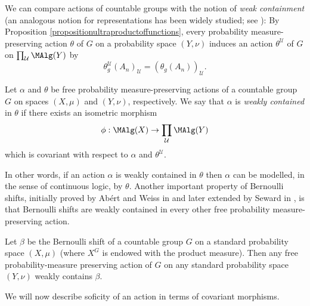 We can compare actions of countable groups with the notion of \emph{weak containment} (an analogous notion for representations has been widely studied; see \cite{MR2415834}): By Proposition \ref{propositionultraproductoffunctions}, every probability measure-preserving action $\theta$ of $G$ on a probability space $(Y,\nu)$ induces an action $\theta^\mathcal{U}$ of $G$ on $\prod_\mathcal{U}\MAlg(Y)$ by
\[\theta^\mathcal{U}_g(A_n)_\mathcal{U}=(\theta_g(A_n))_\mathcal{U}.\]


\begin{definition}[{\cite[p.\ 64]{MR2583950}}]
Let $\alpha$ and $\theta$ be free probability measure-preserving actions of a countable group $G$ on spaces $(X,\mu)$ and $(Y,\nu)$, respectively. We say that $\alpha$ is \emph{weakly contained} in $\theta$ if there exists an isometric morphism
\[\phi:\MAlg(X)\to\prod_\mathcal{U}\MAlg(Y)\]
which is covariant with respect to $\alpha$ and $\theta^\mathcal{U}$.
\end{definition}

In other words, if an action $\alpha$ is weakly contained in $\theta$ then $\alpha$ can be modelled, in the sense of continuous logic, by $\theta$. Another important property of Bernoulli shifts, initially proved by Abért and Weiss in \cite{MR3035287} and later extended by Seward in \cite{arxiv1501.03367v3}, is that Bernoulli shifts are weakly contained in every other free probability measure-preserving action.

\begin{theorem}[{\cite[Theorem 1.1]{MR3035287}}]\label{theoremabertweiss}
Let $\beta$ be the Bernoulli shift of a countable group $G$ on a standard probability space $(X,\mu)$ (where $X^G$ is endowed with the product measure). Then any free probability-measure preserving action of $G$ on any standard probability space $(Y,\nu)$ weakly contains $\beta$.
\end{theorem}

We will now describe soficity of an action in terms of covariant morphisms.


